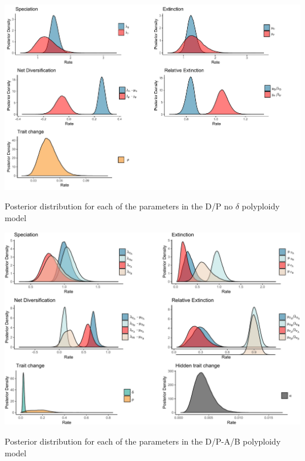 \begin{suppfigure}
\includegraphics[width=\textwidth]{bisseDPnodipposteriordist.pdf}
\caption{Posterior distribution for each of the parameters in the D/P no $\delta$ polyploidy model} %
\label{suppfigure:DPnodip}
\end{suppfigure}

\begin{suppfigure}
\includegraphics[width=\textwidth]{hisseDPposteriordist.pdf}
\caption{Posterior distribution for each of the parameters in the D/P-A/B polyploidy model} %
\label{suppfigure:DPAB}
\end{suppfigure}

